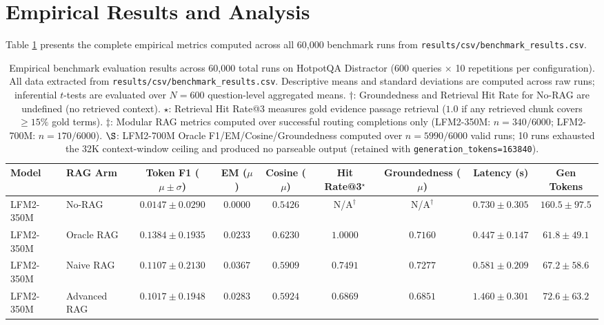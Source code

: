 \documentclass[conference]{IEEEtran}
\begin{document}
\section{Empirical Results and Analysis}
\label{sec:results}

Table \ref{tab:main_results} presents the complete empirical metrics computed across all 60,000 benchmark runs from \texttt{results/csv/benchmark\_results.csv}.

\begin{table}[t]
\centering
\caption{Empirical benchmark evaluation results across 60,000 total runs on HotpotQA Distractor \cite{yang2018hotpotqa} (600 queries $\times$ 10 repetitions per configuration). All data extracted from \texttt{results/csv/benchmark\_results.csv}. Descriptive means and standard deviations are computed across raw runs; inferential $t$-tests are evaluated over $N=600$ question-level aggregated means. $\dagger$: Groundedness and Retrieval Hit Rate for No-RAG are undefined (no retrieved context). $\star$: Retrieval Hit Rate@3 measures gold evidence passage retrieval ($1.0$ if any retrieved chunk covers $\ge 15\%$ gold terms). $\ddagger$: Modular RAG metrics computed over successful routing completions only (LFM2-350M: $n=340/6000$; LFM2-700M: $n=170/6000$). $\S$: LFM2-700M Oracle F1/EM/Cosine/Groundedness computed over $n=5990/6000$ valid runs; 10 runs exhausted the 32K context-window ceiling and produced no parseable output (retained with \texttt{generation\_tokens=163840}).}
\label{tab:main_results}
\tiny
\setlength{\tabcolsep}{2.0pt}
\begin{tabular}{llccccccc}
\toprule
\textbf{Model} & \textbf{RAG Arm} & \textbf{Token F1 ($\mu \pm \sigma$)} & \textbf{EM ($\mu$)} & \textbf{Cosine ($\mu$)} & \textbf{Hit Rate@3$^{\star}$} & \textbf{Groundedness ($\mu$)} & \textbf{Latency (s)} & \textbf{Gen Tokens} \\
\midrule
LFM2-350M & No-RAG & $0.0147 \pm 0.0290$ & $0.0000$ & $0.5426$ & N/A$^{\dagger}$ & N/A$^{\dagger}$ & $0.730 \pm 0.305$ & $160.5 \pm 97.5$ \\
LFM2-350M & Oracle RAG & $\mathbf{0.1384 \pm 0.1935}$ & $0.0233$ & $0.6230$ & $1.0000$ & $0.7160$ & $0.447 \pm 0.147$ & $61.8 \pm 49.1$ \\
LFM2-350M & Naive RAG & $0.1107 \pm 0.2130$ & $\mathbf{0.0367}$ & $0.5909$ & $\mathbf{0.7491}$ & $0.7277$ & $\mathbf{0.581 \pm 0.209}$ & $67.2 \pm 58.6$ \\
LFM2-350M & Advanced RAG & $0.1017 \pm 0.1948$ & $0.0283$ & $0.5924$ & $0.6869$ & $0.6851$ & $1.460 \pm 0.301$ & $72.6 \pm 63.2$ \\

\end{tabular}
\end{table}
\end{document}
